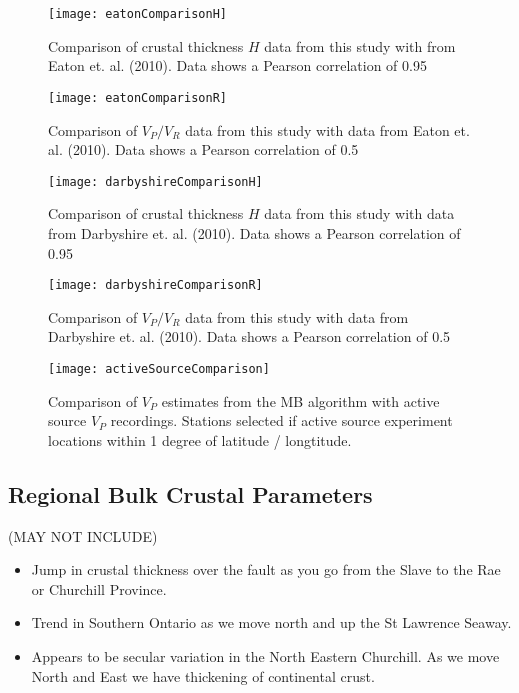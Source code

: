 \documentclass[draft, 12pt]{article}
\begin{document}
\begin{figure}
  \centering
    \texttt{[image: eatonComparisonH]}
  \caption{Comparison of crustal thickness $H$ data from this study with from Eaton et. al. (2010). Data shows a Pearson correlation of 0.95}
  \label{fig:eatonCompH}
\end{figure}

\begin{figure}
  \centering
  \texttt{[image: eatonComparisonR]}
  \caption{Comparison of $V_P / V_R$ data from this study with data from Eaton et. al. (2010). Data shows a Pearson correlation of 0.5}
  \label{fig:eatonCompR}
\end{figure}

\begin{figure}
  \centering
  \texttt{[image: darbyshireComparisonH]}
  \caption{Comparison of crustal thickness $H$ data from this study with data from Darbyshire et. al. (2010). Data shows a Pearson correlation of 0.95}
  \label{fig:darbyshireCompH}
\end{figure}

\begin{figure}
  \centering
  \texttt{[image: darbyshireComparisonR]}
  \caption{Comparison of $V_P / V_R$ data from this study with data from Darbyshire et. al. (2010). Data shows a Pearson correlation of 0.5}
  \label{fig:darbyshireCompR}
\end{figure}



\begin{figure}
  \centering
  \texttt{[image: activeSourceComparison]}
  \caption{Comparison of $V_P$ estimates from the MB algorithm with active source $V_P$ recordings. Stations selected if active source experiment locations within 1 degree of latitude / longtitude.}
  \label{fig:activeComp}
\end{figure}

\subsection{Regional Bulk Crustal Parameters}
(MAY NOT INCLUDE)
\begin{itemize}
  \item Jump in crustal thickness over the fault as you go from the Slave to the Rae or Churchill Province.
  \item Trend in Southern Ontario as we move north and up the St Lawrence Seaway.
  \item Appears to be secular variation in the North Eastern Churchill. As we move North and East we have thickening of continental crust.
\end{itemize}
\end{document}
